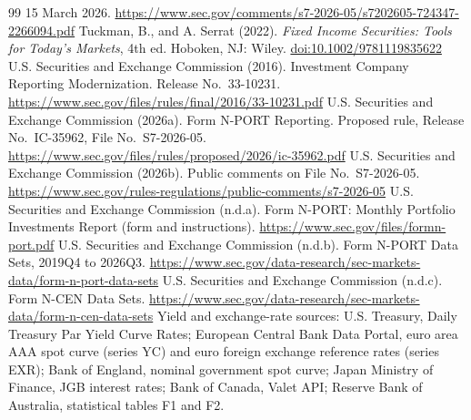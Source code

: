\documentclass[11pt]{article}
\newcommand{\doi}[1]{\href{https://doi.org/#1}{doi:#1}}
\begin{document}
\begin{thebibliography}{99}
15 March 2026. \url{https://www.sec.gov/comments/s7-2026-05/s7202605-724347-2266094.pdf}
 Tuckman, B., and A. Serrat (2022). \emph{Fixed Income Securities: Tools for Today's Markets}, 4th ed. Hoboken, NJ: Wiley. \doi{10.1002/9781119835622}
 U.S. Securities and Exchange Commission (2016). Investment Company
Reporting Modernization. Release No.\ 33-10231.
\url{https://www.sec.gov/files/rules/final/2016/33-10231.pdf}
 U.S. Securities and Exchange Commission (2026a). Form N-PORT
Reporting. Proposed rule, Release No.\ IC-35962, File No.\ S7-2026-05.
\url{https://www.sec.gov/files/rules/proposed/2026/ic-35962.pdf}
 U.S. Securities and Exchange Commission (2026b). Public comments
on File No.\ S7-2026-05. \url{https://www.sec.gov/rules-regulations/public-comments/s7-2026-05}
 U.S. Securities and Exchange Commission (n.d.a). Form N-PORT:
Monthly Portfolio Investments Report (form and instructions). \url{https://www.sec.gov/files/formn-port.pdf}
 U.S. Securities and Exchange Commission (n.d.b). Form N-PORT
Data Sets, 2019Q4 to 2026Q3. \url{https://www.sec.gov/data-research/sec-markets-data/form-n-port-data-sets}
 U.S. Securities and Exchange Commission (n.d.c). Form N-CEN Data
Sets. \url{https://www.sec.gov/data-research/sec-markets-data/form-n-cen-data-sets}
 Yield and exchange-rate sources: U.S. Treasury, Daily Treasury Par
Yield Curve Rates; European Central Bank Data Portal, euro area AAA spot curve (series YC) and euro
foreign exchange reference rates (series EXR); Bank of England, nominal government spot curve; Japan
Ministry of Finance, JGB interest rates; Bank of Canada, Valet API; Reserve Bank of Australia,
statistical tables F1 and F2.
\end{thebibliography}
\end{document}
